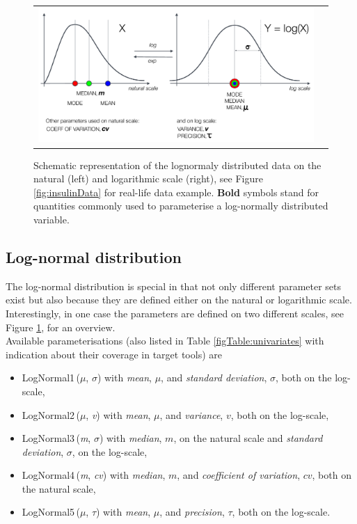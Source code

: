 \begin{figure}[htb!]
\centering
\begin{tabular}{cc}
 \includegraphics[width=160mm]{pics/normalAndLogDomain_schema}
\end{tabular}
\caption{Schematic representation of the lognormaly distributed data on the natural (left) 
and logarithmic scale (right), see Figure \ref{fig:insulinData} for real-life data example. 
\textbf{Bold} symbols stand for quantities commonly used to parameterise a log-normally 
distributed variable.}
\label{fig:schematicLogNormal}
\end{figure}

\subsection{Log-normal distribution}
\label{subsec:logNormalForms}
The log-normal distribution is special in that not only different parameter sets exist
but also because they are defined either on the natural or logarithmic scale. Interestingly, in one 
case the parameters are defined on two different scales, see Figure \ref{fig:schematicLogNormal},
for an overview.\\
Available parameterisations (also listed in Table \ref{figTable:univariates} 
with indication about their coverage in target tools) are 
\begin{itemize}
\item
LogNormal1\,($\mu$, $\sigma$) with \emph{mean}, $\mu$, and \emph{standard deviation}, $\sigma$, both on the log-scale, 
\item
LogNormal2\,($\mu$, \textit{v}) with \emph{mean}, $\mu$, and \emph{variance}, $v$, both on the log-scale, 
\item
LogNormal3\,(\textit{m}, $\sigma$)  with \emph{median}, $m$, on the natural scale and \emph{standard deviation}, $\sigma$, on the log-scale, 
\item
LogNormal4\,(\textit{m}, \textit{cv}) with \emph{median}, $m$, and \emph{coefficient of variation}, $cv$, both on the natural scale, 
\item
LogNormal5\,($\mu$, $\tau$) with \emph{mean}, $\mu$, and \emph{precision}, $\tau$, both on the log-scale.
\end{itemize}


